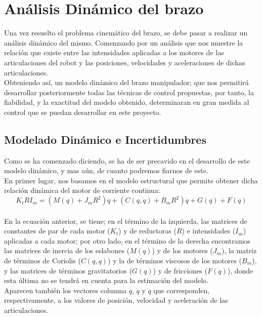 \section{Análisis Dinámico del brazo}
Una vez resuelto el problema cinemático del brazo, se debe pasar a realizar un análisis dinámico del mismo. Comenzando por un análisis que nos muestre la relación que existe entre las intensidades aplicadas a los motores de las articulaciones del robot y las posiciones, velocidades y aceleraciones de dichas articulaciones.\\
Obteniendo así, un modelo dinámico del brazo manipulador; que nos permitirá desarrollar posteriormente todas las técnicas de control propuestas, por tanto, la fiabilidad, y la exactitud del modelo obtenido, determinaran en gran medida al control que se puedan desarrollar en este proyecto.


\subsection{Modelado Dinámico e Incertidumbres}
Como se ha comenzado diciendo, se ha de ser precavido en el desarrollo de este modelo dinámico, y mas aún, de cuanto podremos fiarnos de este.\\

En primer lugar, nos basamos en el modelo estructural que permite obtener dicha relación dinámica del motor de corriente continua:\\

	\begin{equation}
	K_tRI_m=(M(q)+J_mR^2)\ddot{q}+(C(q,\dot{q})+B_mR^2)\dot{q}+G(q)+F(\dot{q})
	\end{equation}\\

En la ecuación anterior, se tiene; en el término de la izquierda, las matrices de constantes de par de cada motor ($K_t$) y de reductoras ($R$) e intensidades ($I_m$) aplicadas a cada motor; por otro lado, en el término de la derecha encontramos las matrices de inercia de los eslabones ($M(q)$) y de los motores ($J_m$), la matriz de términos de Coriolis ($C(q,\dot{q})$) y la de términos viscosos de los motores ($B_m$), y las matrices de términos gravitatorios ($G(q)$) y de fricciones ($F(\dot{q})$), donde esta última no se tendrá en cuenta para la estimación del modelo.\\

Aparecen también los vectores columna $q$, $\dot{q}$ y $\ddot{q}$ que corresponden, respectivamente, a los valores de posición, velocidad y aceleración de las articulaciones.\\

